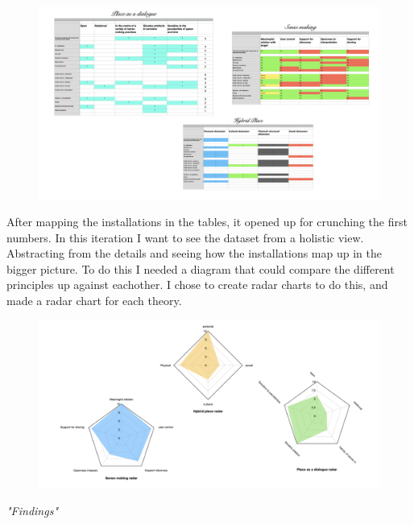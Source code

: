 \begin{figure}[H]
\includegraphics[width=13cm]{pictures/dataset/analysis_tables.png}
\centering 
\end{figure}

After mapping the installations in the tables, it opened up for crunching the first numbers. In this iteration I want to see the dataset from a holistic view. Abstracting from the details and seeing how the installations map up in the bigger picture. To do this I needed a diagram that could compare the different principles up against eachother. I chose to create radar charts to do this, and made a radar chart for each theory. 

\begin{figure}[H]
\includegraphics[width=13cm]{pictures/dataset/analysis_radars.png}
\centering 
\end{figure}

\emph{"Findings"}
\par

